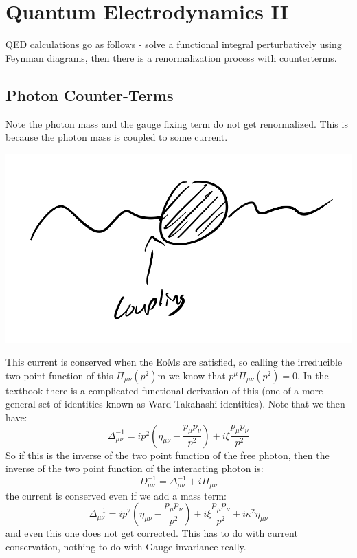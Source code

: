 \section{Quantum Electrodynamics II}
QED calculations go as follows - solve a functional integral perturbatively using Feynman diagrams, then there is a renormalization process with counterterms.

\subsection{Photon Counter-Terms}
Note the photon mass and the gauge fixing term do not get renormalized. This is because the photon mass is coupled to some current.

\begin{center}
    \includegraphics[scale=0.5]{Images/lec32p1.png}
\end{center}

This current is conserved when the EoMs are satisfied, so calling the irreducible two-point function of this $\Pi_{\mu\nu}(p^2)$m we know that $p^\mu \Pi_{\mu\nu}(p^2) = 0$. In the textbook there is a complicated functional derivation of this (one of a more general set of identities known as Ward-Takahashi identities). Note that we then have:
\begin{equation}
    \Delta_{\mu\nu}^{-1} = ip^2\left(\eta_{\mu\nu} - \frac{p_\mu p_\nu}{p^2}\right) + i \xi \frac{p_\mu p_\nu}{p^2}
\end{equation}
So if this is the inverse of the two point function of the free photon, then the inverse of the two point function of the interacting photon is:
\begin{equation}
    D^{-1}_{\mu\nu} = \Delta^{-1}_{\mu\nu} + i\Pi_{\mu\nu}
\end{equation} 
the current is conserved even if we add a mass term:
\begin{equation}
    \Delta_{\mu\nu}^{-1} = ip^2\left(\eta_{\mu\nu} - \frac{p_\mu p_\nu}{p^2}\right) + i \xi \frac{p_\mu p_\nu}{p^2} + i\kappa^2 \eta_{\mu\nu}
\end{equation}
and even this one does not get corrected. This has to do with current conservation, nothing to do with Gauge invariance really.


